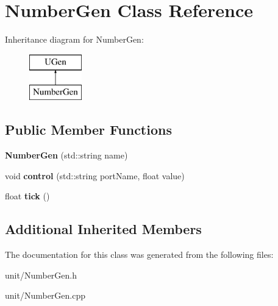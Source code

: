 \hypertarget{classNumberGen}{}\section{Number\+Gen Class Reference}
\label{classNumberGen}
Inheritance diagram for Number\+Gen\+:\begin{figure}[H]
\begin{center}
\leavevmode
\includegraphics[height=2.000000cm]{classNumberGen}
\end{center}
\end{figure}
\subsection*{Public Member Functions}
\begin{DoxyCompactItemize}
\item 
{\bfseries Number\+Gen} (std\+::string name)\hypertarget{classNumberGen_a6e93812c4805a43f19f8fb11680e32a4}{}\label{classNumberGen_a6e93812c4805a43f19f8fb11680e32a4}

\item 
void {\bfseries control} (std\+::string port\+Name, float value)\hypertarget{classNumberGen_a9daaaf8a12389873494bb1ad2f877c8c}{}\label{classNumberGen_a9daaaf8a12389873494bb1ad2f877c8c}

\item 
float {\bfseries tick} ()\hypertarget{classNumberGen_a38cef7d64a12e40bf2ae14f29def41ca}{}\label{classNumberGen_a38cef7d64a12e40bf2ae14f29def41ca}

\end{DoxyCompactItemize}
\subsection*{Additional Inherited Members}


The documentation for this class was generated from the following files\+:\begin{DoxyCompactItemize}
\item 
unit/Number\+Gen.\+h\item 
unit/Number\+Gen.\+cpp\end{DoxyCompactItemize}

